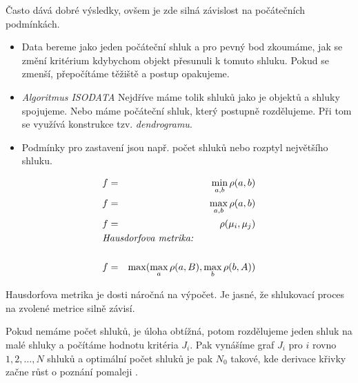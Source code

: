 Často dává dobré výsledky, ovšem je zde silná závislost na počátečních podmínkách.


\begin{itemize}
\item Data bereme jako jeden počáteční shluk a pro pevný bod zkoumáme, jak se změní kritérium kdybychom
objekt přesunuli k tomuto shluku. Pokud se zmenší, přepočítáme těžiště a postup opakujeme.
\item {\em Algoritmus ISODATA} Nejdříve máme tolik shluků jako je objektů a shluky spojujeme. Nebo máme počáteční shluk,
který postupně rozdělujeme. Při tom se využívá konstrukce tzv. {\em dendrogramu}.
\item Podmínky pro zastavení jsou např. počet shluků nebo rozptyl největšího shluku.
\end{itemize}


\begin{eqnarray}
f&=&\min\limits_{a,b}\rho(a,b)\\
f&=&\max\limits_{a,b}\rho(a,b)\\
f&=&\rho(\mu_i,\mu_j)\\
\noalign{\hbox{{\em Hausdorfova metrika: }}}\nonumber\\ 
f&=&\max(\max\limits_a\rho(a,B),\max\limits_b\rho(b,A))
\end{eqnarray}

Hausdorfova metrika je dosti náročná na výpočet. Je jasné, že shlukovací proces na zvolené metrice silně závisí.

Pokud nemáme počet shluků, je úloha obtížná, potom rozdělujeme jeden shluk na malé shluky a počítáme hodnotu
kritéria $J_i$. Pak vynášíme graf $J_i$ pro $i$ rovno $1,2,\dots,N$ shluků a optimální počet shluků je pak $N_0$
takové, kde derivace křivky začne růst o poznání pomaleji .


